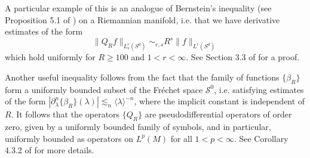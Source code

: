 \begin{remarks}
\begin{enumerate}
    A particular example of this is an analogue of Bernstein's inequality (see Proposition 5.1 of \cite{Wolff}) on a Riemannian manifold, i.e. that we have derivative estimates of the form
    \begin{equation} \label{ManifoldBernsteinInequality}
        \| Q_R f \|_{L^r_s(S^d)} \sim_{r,s} R^s \| f \|_{L^r(S^d)}
    \end{equation}
    which hold uniformly for $R \geq 100$ and $1 < r < \infty$. See Section 3.3 of \cite{Sogge} for a proof.

    Another useful inequality follows from the fact that the family of functions $\{ \beta_R \}$ form a uniformly bounded subset of the Fr\'{e}chet space $\mathcal{S}^0$, i.e. satisfying estimates of the form $|\partial_\lambda^n \{ \beta_R \}(\lambda)| \lesssim_n \langle \lambda \rangle^{-n}$, where the implicit constant is independent of $R$. It follows that the operators $\{ Q_R \}$ are pseudodifferential operators of order zero, given by a uniformly bounded family of symbols, and in particular, uniformly bounded as operators on $L^p(M)$ for all $1 < p < \infty$. See Corollary 4.3.2 of \cite{Sogge} for more details.
\end{enumerate}
\end{remarks}

\begin{comment}

Our remarks reduce Theorem \ref{MainSphereTheorem} to the following statement.

\begin{theorem} \label{RestrictedMainSphereTheorem}
    Suppose $1 \leq p < 2d/(d+1)$. If $R \geq 100$, then for $f \in V_R$,
    \[ \| M_R f \|_{L^p(S^d)} \lesssim C_p(h) \| f \|_{L^p(S^d)}, \]
    where the implicit constant is uniform in $f$, $h$, and $R$.
\end{theorem}

\begin{proof}[Proof that Theorem \ref{RestrictedMainSphereTheorem} implies Theorem \ref{MainSphereTheorem}]
    Remark 2 shows that the analysis of $\{ M_R \}$ for $R \leq 100$ is trivial. For any $f \in L^p(S^d)$, $Q_R f \in V_R$, we conclude from Remark 3 that
    \[ \| M_R f \|_{L^p(S^d)} = \| M_R (Q_R f) \|_{L^p(S^d)} \lesssim C_p(h) \| Q_R f \|_{L^p(S^d)} \lesssim C_p(h) \| f \|_{L^p(S^d)}. \]
    We have thus obtained the required bound for general inputs.
\end{proof}

\end{comment}


